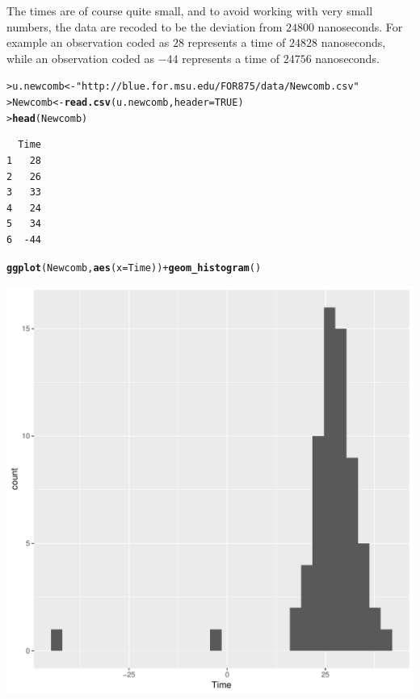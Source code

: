 \documentclass[12pt,oneside]{book}\usepackage[]{graphicx}\usepackage[]{color}
\makeatletter
\def\maxwidth{ %
  \ifdim\Gin@nat@width>\linewidth
    \linewidth
  \else
    \Gin@nat@width
  \fi
}
\newcommand{\hlnum}[1]{\textcolor[rgb]{0.686,0.059,0.569}{#1}}%
\newcommand{\hlstr}[1]{\textcolor[rgb]{0.192,0.494,0.8}{#1}}%
\newcommand{\hlopt}[1]{\textcolor[rgb]{0,0,0}{#1}}%
\newcommand{\hlstd}[1]{\textcolor[rgb]{0.345,0.345,0.345}{#1}}%
\newcommand{\hlkwb}[1]{\textcolor[rgb]{0.69,0.353,0.396}{#1}}%
\newcommand{\hlkwc}[1]{\textcolor[rgb]{0.333,0.667,0.333}{#1}}%
\newcommand{\hlkwd}[1]{\textcolor[rgb]{0.737,0.353,0.396}{\textbf{#1}}}%
\newenvironment{kframe}{%
 \def\at@end@of@kframe{}%
 \ifinner\ifhmode%
  \def\at@end@of@kframe{\end{minipage}}%
  \begin{minipage}{\columnwidth}%
 \fi\fi%
 \def\FrameCommand##1{\hskip\@totalleftmargin \hskip-\fboxsep
 \colorbox{shadecolor}{##1}\hskip-\fboxsep
     \hskip-\linewidth \hskip-\@totalleftmargin \hskip\columnwidth}%
 \MakeFramed {\advance\hsize-\width
   \@totalleftmargin\z@ \linewidth\hsize
   \@setminipage}}%
 {\par\unskip\endMakeFramed%
 \at@end@of@kframe}
\newenvironment{knitrout}{}{} %
\makeatother
\begin{document}
The times are of course quite small, and to avoid working with very small numbers, the data are recoded to be the deviation from $24800$ nanoseconds. For example an observation coded as $28$ represents a time of $24828$ nanoseconds, while an observation coded as $-44$ represents a time of $24756$ nanoseconds.  
\begin{knitrout}
\color{fgcolor}\begin{kframe}
\begin{alltt}
\hlstd{> }\hlstd{u.newcomb} \hlkwb{<-} \hlstr{"http://blue.for.msu.edu/FOR875/data/Newcomb.csv"}
\hlstd{> }\hlstd{Newcomb} \hlkwb{<-} \hlkwd{read.csv}\hlstd{(u.newcomb,} \hlkwc{header} \hlstd{=} \hlnum{TRUE}\hlstd{)}
\hlstd{> }\hlkwd{head}\hlstd{(Newcomb)}
\end{alltt}
\begin{verbatim}
  Time
1   28
2   26
3   33
4   24
5   34
6  -44
\end{verbatim}
\end{kframe}
\end{knitrout}

\begin{knitrout}
\color{fgcolor}\begin{kframe}
\begin{alltt}
\hlkwd{ggplot}\hlstd{(Newcomb,} \hlkwd{aes}\hlstd{(}\hlkwc{x} \hlstd{= Time))} \hlopt{+} \hlkwd{geom_histogram}\hlstd{()}
\end{alltt}


{\ttfamily\noindent\itshape\color{messagecolor}{`stat\_bin()` using `bins = 30`. Pick better value with\\`binwidth`.}}\end{kframe}
\includegraphics[width=\maxwidth]{figure/unnamed-chunk-76-1} 

\end{knitrout}
\end{document}
